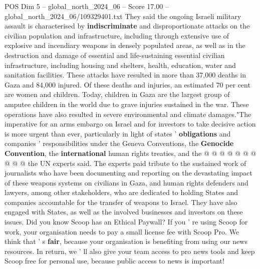 \begin{textsample}{POS Dim 5 – global\_north\_2024\_06 – Score 17.00 – global\_north\_2024\_06/109329401.txt}
They said the ongoing Israeli military assault is characterised by \textbf{indiscriminate} and disproportionate attacks on the civilian population and infrastructure, including through extensive use of explosive and incendiary weapons in densely populated areas, as well as in the destruction and damage of essential and life-sustaining essential civilian infrastructure, including housing and shelters, health, education, water and sanitation facilities.
These attacks have resulted in more than 37,000 deaths in Gaza and 84,000 injured.
Of these deaths and injuries, an estimated 70 per cent are women and children.
Today, children in Gaza are the largest group of amputee children in the world due to grave injuries sustained in the war.
These operations have also resulted in severe environmental and climate damages."The imperative for an arms embargo on Israel and for investors to take decisive action is more urgent than ever, particularly in light of states ' \textbf{obligations} and companies ' responsibilities under the Geneva Conventions, the \textbf{Genocide} \textbf{Convention}, the \textbf{international} human rights treaties, and the @ @ @ @ @ @ @ @ @ @ the UN experts said.
The experts paid tribute to the sustained work of journalists who have been documenting and reporting on the devastating impact of these weapons systems on civilians in Gaza, and human rights defenders and lawyers, among other stakeholders, who are dedicated to holding States and companies accountable for the transfer of weapons to Israel.
They have also engaged with States, as well as the involved businesses and investors on these issues.
Did you know Scoop has an Ethical Paywall?
If you ' re using Scoop for work, your organisation needs to pay a small license fee with Scoop Pro.
We think that ' s \textbf{fair}, because your organisation is benefiting from using our news resources.
In return, we ' ll also give your team access to pro news tools and keep Scoop free for personal use, because public access to news is important!

\end{textsample}
